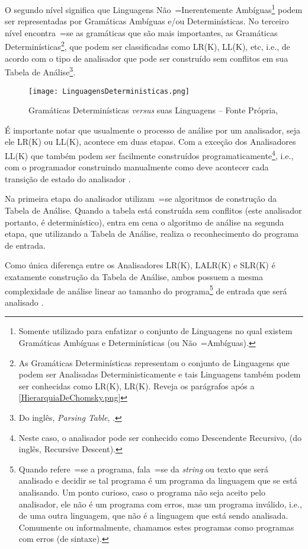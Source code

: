     O segundo nível significa que Linguagens Não~=Inerentemente Ambíguas\footnote{
    Somente utilizado para enfatizar o conjunto de Linguagens no qual existem Gramáticas Ambíguas e
    Determinísticas (ou Não~=Ambíguas).
    }
    podem ser representadas por Gramáticas Ambíguas e\slash{}ou Determinísticas.
    No terceiro nível encontra~=se as gramáticas que são mais importantes,
    as Gramáticas Determinísticas\footnote{
    As Gramáticas Determinísticas representam o conjunto de Linguagens que podem ser Analisadas Deterministicamente e
    tais Linguagens também podem ser conhecidas como LR(K),
    LR(K).
    Reveja os parágrafos após a \autoref{HierarquiaDeChomsky.png}
    },
    que podem ser classificadas como LR(K),
    LL(K), etc, i.e.,
    de acordo com o tipo de analisador que pode ser construído sem conflitos em sua Tabela de Análise\footnote{
    Do inglês, \textit{Parsing Table},
    \cite{ahoCompilerDragonBook}.
    }.
    \begin{figure}[h]
    \centering
    \texttt{[image: LinguagensDeterministicas.png]}
    \caption[Gramáticas Determinísticas \textit{versus} suas Linguagens]{Gramáticas Determinísticas \textit{versus} suas Linguagens -- Fonte Própria,
    }
    \label{LinguagensDeterministicas.png}
    \end{figure}

    É importante notar que usualmente o processo de análise por um analisador,
    seja ele LR(K) ou
    LL(K),
    acontece em duas etapas.
    Com a exceção dos Analisadores LL(K) que também podem ser facilmente construídos programaticamente\footnote{
    Neste caso,
    o analisador pode ser conhecido como Descendente Recursivo,
    (do inglês,
    Recursive Descent).
    },
    i.e.,
    com o programador construindo manualmente como deve acontecer cada transição de estado do analisador \cite{ahoCompilerDragonBook}.

    Na primeira etapa do analisador utilizam~=se algoritmos de construção da Tabela de Análise.
    Quando a tabela está construída sem conflitos (este analisador portanto,
    é determinístico),
    entra em cena o algoritmo de análise na segunda etapa,
    que utilizando a Tabela de Análise,
    realiza o reconhecimento do programa de entrada.

    Como única diferença entre os Analisadores LR(K),
    LALR(K) e
    SLR(K) é exatamente construção da Tabela de Análise,
    ambos possuem a mesma complexidade de análise linear ao tamanho do programa\footnote{
    Quando refere~=se a programa,
    fala~=se da \textit{string} ou
    texto que será analisado e
    decidir se tal programa é um programa da linguagem que se está analisando.
    Um ponto curioso,
    caso o programa não seja aceito pelo analisador,
    ele não é um programa com erros,
    mas um programa inválido,
    i.e.,
    de uma outra linguagem,
    que não é a linguagem que está sendo analisada.
    Comumente ou
    informalmente,
    chamamos estes programas como programas com erros (de sintaxe).
    }
    de entrada que será analisado \cite{knuthLrParser1965,linearLL1AndLR1Grammars,generalContextFreeParsingAlgorithm}.

